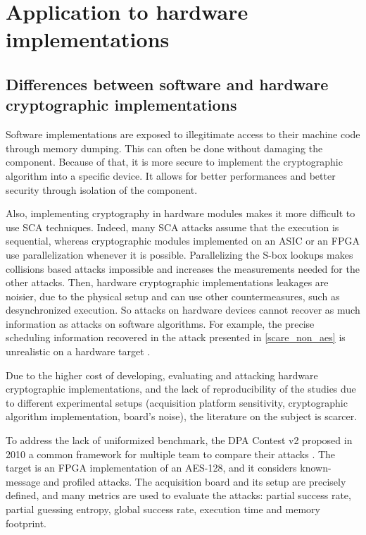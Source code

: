 \documentclass[11pt]{sdm}
\begin{document}


\section{Application to hardware implementations}

\subsection{Differences between software and hardware cryptographic implementations}

Software implementations are exposed to illegitimate access to their machine code through memory dumping.
This can often be done without damaging the component.
Because of that, it is more secure to implement the cryptographic algorithm into a specific device.
It allows for better performances and better security through isolation of the component.

Also, implementing cryptography in hardware modules makes it more difficult to use SCA techniques.
Indeed, many SCA attacks assume that the execution is sequential, whereas cryptographic modules implemented on an ASIC or an FPGA use parallelization whenever it is possible.
Parallelizing the S-box lookups makes collisions based attacks impossible and increases the measurements needed for the other attacks.
Then, hardware cryptographic implementations leakages are noisier, due to the physical setup and can use other countermeasures, such as desynchronized execution.
So attacks on hardware devices cannot recover as much information as attacks on software algorithms.
For example, the precise scheduling information recovered in the attack presented in \ref{scare_non_aes} is unrealistic on a hardware target \parencite{Daudigny_Ledig_Muller_Valette_2005}.


Due to the higher cost of developing, evaluating and attacking hardware cryptographic implementations, and the lack of reproducibility of the studies due to different experimental setups (acquisition platform sensitivity, cryptographic algorithm implementation, board's noise), the literature on the subject is scarcer.

To address the lack of uniformized benchmark, the DPA Contest v2 proposed in 2010 a common framework for multiple team to compare their attacks \parencite{Clavier_Danger_Duc_Elaabid_Gérard_Guilley_Heuser_Kasper_Li_Lomné_et_al_2014}.
The target is an FPGA implementation of an AES-128, and it considers known-message and profiled attacks.
The acquisition board and its setup are precisely defined, and many metrics are used to evaluate the attacks: partial success rate, partial guessing entropy, global success rate, execution time and memory footprint.
\end{document}

